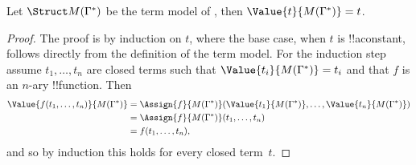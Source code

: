 \begin{lem} 
 Let $\Struct M(\Gamma^*)$ be the term model
of , then $\Value{t}{M(\Gamma^*)} = t$.
\end{lem}
\begin{proof} 
 The proof is by induction on $t$, where the base case, when $t$
 is !!a{constant}, follows directly from the definition of the term
 model. For the induction step assume $t_1, \ldots, t_n$ are closed terms
 such that $\Value{t_i}{M(\Gamma^*)} = t_i$ and that $f$ is an $n$-ary
 !!{function}. Then 
\begin{align*}
\Value{f(t_1,\ldots,t_n)}{M(\Gamma^*)} &= \Assign{f}{M(\Gamma^*)}(\Value{t_1}
 {M(\Gamma^*)}, 
\ldots, \Value{t_n}{M(\Gamma^*)}) \\
&= \Assign{f}{M(\Gamma^*)}(t_1, \dots, t_n) \\
&= f(t_1,\dots, t_n),
\end{align*} 
and so by induction this holds for every closed term~$t$.
\end{proof}
